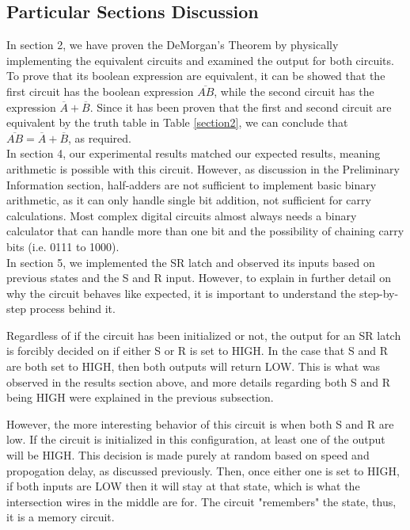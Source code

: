 \documentclass{report}
\begin{document}
	\subsection{Particular Sections Discussion}
		In section 2, we have proven the DeMorgan's Theorem by physically implementing the equivalent circuits and examined the output for both circuits. To prove that its boolean expression are equivalent, it can be showed that the first circuit has the boolean expression $\overline{AB}$, while the second circuit has the expression $\overline{A} + \overline{B}$. Since it has been proven that the first and second circuit are equivalent by the truth table in Table \ref{section2}, we can conclude that $\overline{AB} = \overline{A} + \overline{B}$, as required. \\
		
		In section 4, our experimental results matched our expected results, meaning arithmetic is possible with this circuit. However, as discussion in the Preliminary Information section, half-adders are not sufficient to implement basic binary arithmetic, as it can only handle single bit addition, not sufficient for carry calculations. Most complex digital circuits almost always needs a binary calculator that can handle more than one bit and the possibility of chaining carry bits (i.e. 0111 to 1000). \\
		
		In section 5, we implemented the SR latch and observed its inputs based on previous states and the S and R input. However, to explain in further detail on why the circuit behaves like expected, it is important to understand the step-by-step process behind it.
		
		Regardless of if the circuit has been initialized or not, the output for an SR latch is forcibly decided on if either S or R is set to HIGH. In the case that S and R are both set to HIGH, then both outputs will return LOW. This is what was observed in the results section above, and more details regarding both S and R being HIGH were explained in the previous subsection.
		
		However, the more interesting behavior of this circuit is when both S and R are low. If the circuit is initialized in this configuration, at least one of the output will be HIGH. This decision is made purely at random based on speed and propogation delay, as discussed previously. Then, once either one is set to HIGH, if both inputs are LOW then it will stay at that state, which is what the intersection wires in the middle are for. The circuit "remembers" the state, thus, it is a memory circuit. \\
		
\end{document}

